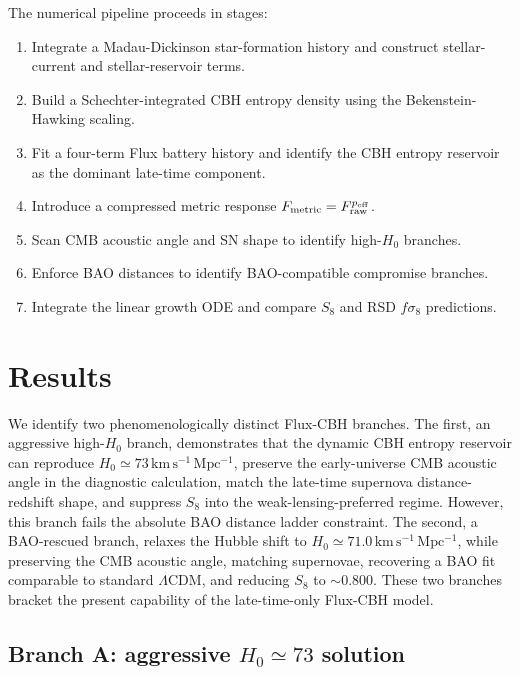 \documentclass[11pt,a4paper]{article}
\newcommand{\LCDM}{\ensuremath{\Lambda\mathrm{CDM}}}
\newcommand{\kmsmpc}{\ensuremath{\mathrm{km\,s^{-1}\,Mpc^{-1}}}}
\begin{document}
The numerical pipeline proceeds in stages:
\begin{enumerate}
\item Integrate a Madau-Dickinson star-formation history and construct stellar-current and stellar-reservoir terms.
\item Build a Schechter-integrated CBH entropy density using the Bekenstein-Hawking scaling.
\item Fit a four-term Flux battery history and identify the CBH entropy reservoir as the dominant late-time component.
\item Introduce a compressed metric response $F_{\rm metric}=F_{\rm raw}^{p_{\rm eff}}$.
\item Scan CMB acoustic angle and SN shape to identify high-$H_0$ branches.
\item Enforce BAO distances to identify BAO-compatible compromise branches.
\item Integrate the linear growth ODE and compare $S_8$ and RSD $f\sigma_8$ predictions.
\end{enumerate}

\section{Results}

We identify two phenomenologically distinct Flux-CBH branches. The first, an aggressive high-$H_0$ branch, demonstrates that the dynamic CBH entropy reservoir can reproduce $H_0\simeq73\,\kmsmpc$, preserve the early-universe CMB acoustic angle in the diagnostic calculation, match the late-time supernova distance-redshift shape, and suppress $S_8$ into the weak-lensing-preferred regime. However, this branch fails the absolute BAO distance ladder constraint. The second, a BAO-rescued branch, relaxes the Hubble shift to $H_0\simeq71.0\,\kmsmpc$, while preserving the CMB acoustic angle, matching supernovae, recovering a BAO fit comparable to standard \LCDM{}, and reducing $S_8$ to $\sim0.800$. These two branches bracket the present capability of the late-time-only Flux-CBH model.

\subsection{Branch A: aggressive $H_0\simeq73$ solution}
\end{document}
